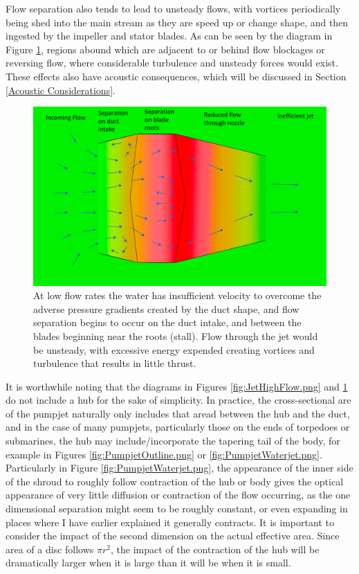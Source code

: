 \documentclass{article}\usepackage[]{graphicx}\usepackage[]{color}
\begin{document}
Flow separation also tends to lead to unsteady flows, with vortices periodically being shed into the main stream as they are speed up or change shape, and then ingested by the impeller and stator blades.  As can be seen by the diagram in Figure \ref{fig:JetLowFlow.png}, regions abound which are adjacent to or behind flow blockages or reversing flow, where considerable turbulence and unsteady forces would exist.  These effects also have acoustic consequences, which will be discussed in Section \ref{Acoustic Considerations}.

\begin{figure}
\includegraphics[width=\textwidth]{JetLowFlow.png}
\caption{At low flow rates the water has insufficient velocity to overcome the adverse pressure gradients created by the duct shape, and flow separation begins to occur on the duct intake, and between the blades beginning near the roots (stall).  Flow through the jet would be unsteady, with excessive energy expended creating vortices and turbulence that results in little thrust.}
\label{fig:JetLowFlow.png}
\end{figure}

It is worthwhile noting that the diagrams in Figures \ref{fig:JetHighFlow.png} and \ref{fig:JetLowFlow.png} do not include a hub for the sake of simplicity.  In practice, the cross-sectional are of the pumpjet naturally only includes that aread between the hub and the duct, and in the case of many pumpjets, particularly those on the ends of torpedoes or submarines, the hub may include/incorporate the tapering tail of the body, for example in Figures \ref{fig:PumpjetOutline.png} or \ref{fig:PumpjetWaterjet.png}.  Particularly in Figure \ref{fig:PumpjetWaterjet.png}, the appearance of the inner side of the shroud to roughly follow contraction of the hub or body gives the optical appearance of very little diffusion or contraction of the flow occurring, as the one dimensional separation might seem to be roughly constant, or even expanding in places where I have earlier explained it generally contracts.  It is important to consider the impact of the second dimension on the actual effective area. Since area of a disc follows $\pi r^2$, the impact of the contraction of the hub will be dramatically larger when it is large than it will be when it is small.
\end{document}
